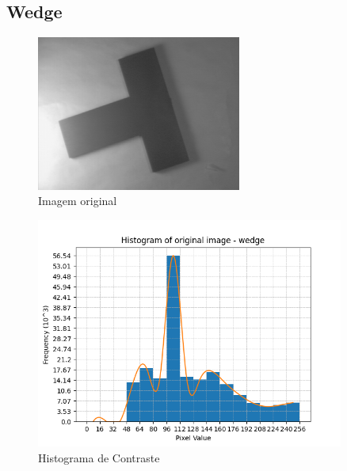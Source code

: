 \documentclass[12pt, letterpaper]{article}
\begin{document}
    \subsection{Wedge}
        \begin{figure}[H]
            \label{hist:wedge}
            \centering
            \includegraphics[width=0.6\textwidth]{wedge.png}
            \\{Imagem original}

            \includegraphics[width=0.9\textwidth]{wedge_histogram.png}
            \\{Histograma de Contraste}
        \end{figure}
\end{document}
